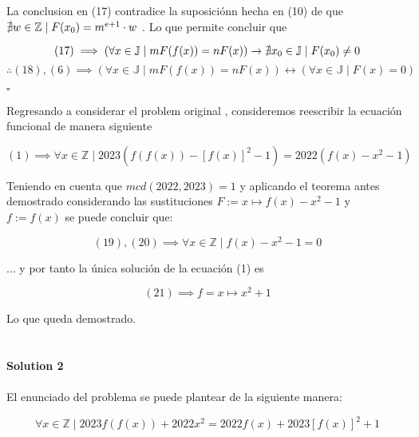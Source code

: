 \documentclass[12pt]{article}
\begin{document}
La conclusion en (17) contradice la suposiciónn hecha en (10)  de que $\nexists w \in \mathbb{Z} \mid F(x\textsubscript{0}) = m^{e+1} \cdot w$ . Lo que permite concluir que 

\begin{equation}
	(17) \implies (\forall x \in \mathbb{J} \mid m F(f(x)) = n  F(x)) \to \nexists x\textsubscript{0} \in \mathbb{J} \mid F(x\textsubscript{0}) \neq 0
\end{equation}
\begin{equation}
	\therefore (18), (6) \implies (\forall x \in \mathbb{J} \mid m F(f(x)) = n  F(x)) \leftrightarrow (\forall x \in \mathbb{J} \mid F(x) = 0)
\end{equation}

\hfill $\square$

Regresando a considerar el problem original , consideremos reescribir la ecuación funcional de manera siguiente 

\begin{equation}
	(1) \implies \forall x \in \mathbb{Z} \mid 2023 (f(f(x)) - [f(x)]^2 - 1) = 2022 (f(x) - x^2 - 1)
\end{equation}

Teniendo en cuenta que $mcd(2022, 2023) = 1$ y aplicando el teorema antes demostrado considerando las sustituciones $F := x \mapsto f(x) -x^2 - 1$ y $f := f(x)$ se puede concluir que:

\begin{equation}
	(19), (20) \implies \forall x \in \mathbb{Z} \mid f(x) - x^2 - 1 = 0
\end{equation}

... y por tanto la única solución de la ecuación (1) es 

\begin{equation}
	(21) \implies f = x \mapsto x^2 + 1
\end{equation}

\vspace{1cm}
Lo que queda demostrado. \\\\\\

\noindent\textbf{Solution 2}\\\\
El enunciado del problema se puede plantear de la siguiente manera:

\begin{equation}
	\forall x \in \mathbb{Z} \mid 2023 f(f(x)) + 2022x^2 = 2022 f(x) + 2023 [f(x)]^2 + 1
\end{equation}
\end{document}
